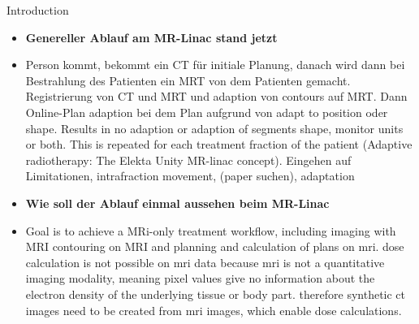 Introduction
\begin{itemize}
    \item \textbf{Genereller Ablauf am MR-Linac stand jetzt}
    \item Person kommt, bekommt ein CT für initiale Planung, danach wird dann bei Bestrahlung des Patienten ein MRT von dem Patienten gemacht. Registrierung von CT und MRT und adaption von contours auf MRT. Dann Online-Plan adaption bei dem Plan aufgrund von adapt to position oder shape. Results in no adaption or adaption of segments shape, monitor units or both. This is repeated for each treatment fraction of the patient (Adaptive radiotherapy: The Elekta Unity MR-linac concept). Eingehen auf Limitationen, intrafraction movement, (paper suchen), adaptation 

    \item \textbf{Wie soll der Ablauf einmal aussehen beim MR-Linac}
    \item Goal is to achieve a MRi-only treatment workflow, including imaging with MRI contouring on MRI and planning and calculation of plans on mri. dose calculation is not possible on mri data because mri is not a quantitative imaging modality, meaning pixel values give no information about the electron density of the underlying tissue or body part. therefore synthetic ct images need to be created from mri images, which enable dose calculations. 
    

\end{itemize}
